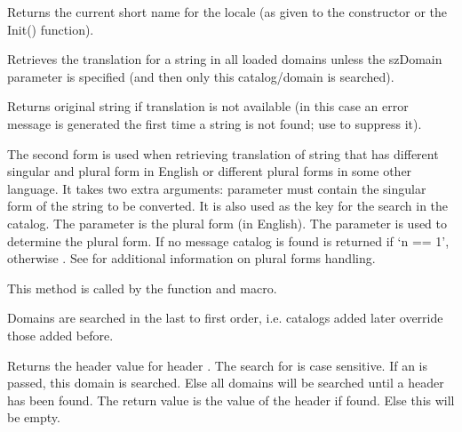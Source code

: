 Returns the current short name for the locale (as given to the constructor or
the Init() function).


\label{wxlocalegetstring}



Retrieves the translation for a string in all loaded domains unless the szDomain
parameter is specified (and then only this catalog/domain is searched).

Returns original string if translation is not available
(in this case an error message is generated the first time
a string is not found; use  to suppress it).

The second form is used when retrieving translation of string that has
different singular and plural form in English or different plural forms in some
other language. It takes two extra arguments: 
parameter must contain the singular form of the string to be converted.
It is also used as the key for the search in the catalog.
The  parameter is the plural form (in English).
The parameter  is used to determine the plural form.  If no
message catalog is found  is returned if `n == 1',
otherwise .
See  for additional information on plural forms handling.

This method is called by the 
function and  macro.


Domains are searched in the last to first order, i.e. catalogs
added later override those added before.


\label{wxlocalegetheadervalue}


Returns the header value for header . The search for  is case sensitive. If an 
is passed, this domain is searched. Else all domains will be searched until a header has been found.
The return value is the value of the header if found. Else this will be empty.

